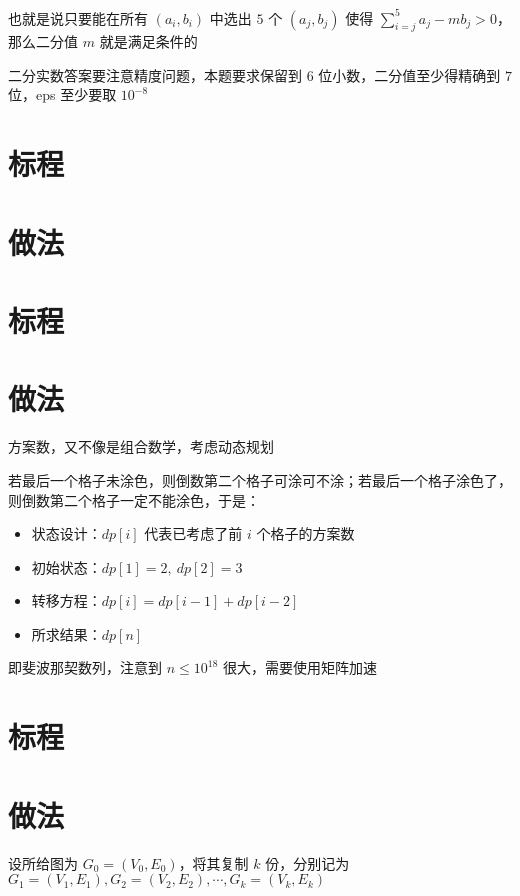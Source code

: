 \documentclass{../cpct/ctsol}
\begin{document}
也就是说只要能在所有 $(a_i,b_i)$ 中选出 $5$ 个 $(a_j,b_j)$ 使得 $\sum_{i=j}^{5}a_j-mb_j > 0$，那么二分值 $m$ 就是满足条件的

二分实数答案要注意精度问题，本题要求保留到 $6$ 位小数，二分值至少得精确到 $7$ 位，eps 至少要取 ${10}^{-8}$

\section*{标程}


\makesolution
\section*{做法}

\section*{标程}

\makesolution
\section*{做法}

方案数，又不像是组合数学，考虑动态规划

若最后一个格子未涂色，则倒数第二个格子可涂可不涂；若最后一个格子涂色了，则倒数第二个格子一定不能涂色，于是：

\begin{itemize}
    \item 状态设计：$dp[i]$ 代表已考虑了前 $i$ 个格子的方案数
    \item 初始状态：$dp[1] = 2,~dp[2] = 3$
    \item 转移方程：$dp[i] = dp[i-1] + dp[i-2]$
    \item 所求结果：$dp[n]$
\end{itemize}

即斐波那契数列，注意到 $n \leq {10}^{18}$ 很大，需要使用矩阵加速

\section*{标程}


\makesolution
\section*{做法}

设所给图为 $G_0=(V_0,E_0)$，将其复制 $k$ 份，分别记为 $G_1=(V_1,E_1),G_2=(V_2,E_2),\cdots,G_k=(V_k,E_k)$
\end{document}
